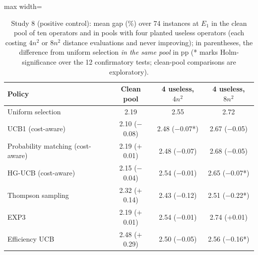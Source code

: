 \begin{table}[t]
\caption{Study 8 (positive control): mean gap (\%) over 74 instances at $E_1$ in the clean pool of ten operators and in pools with four planted useless operators (each costing $4n^2$ or $8n^2$ distance evaluations and never improving); in parentheses, the difference from uniform selection \emph{in the same pool} in pp (* marks Holm-significance over the 12 confirmatory tests; clean-pool comparisons are exploratory).}\label{tab:s8}
\centering
\small
\begin{adjustbox}{max width=\linewidth}
\begin{tabular}{lccc}
\toprule
Policy & Clean pool & 4 useless, $4n^2$ & 4 useless, $8n^2$ \\
\midrule
Uniform selection & 2.19 & 2.55 & 2.72 \\
UCB1 (cost-aware) & 2.10 ($-$0.08) & 2.48 ($-$0.07*) & 2.67 ($-$0.05) \\
Probability matching (cost-aware) & 2.19 ($+$0.01) & 2.48 ($-$0.07) & 2.68 ($-$0.05) \\
HG-UCB (cost-aware) & 2.15 ($-$0.04) & 2.54 ($-$0.01) & 2.65 ($-$0.07*) \\
Thompson sampling & 2.32 ($+$0.14) & 2.43 ($-$0.12) & 2.51 ($-$0.22*) \\
EXP3 & 2.19 ($+$0.01) & 2.54 ($-$0.01) & 2.74 ($+$0.01) \\
Efficiency UCB & 2.48 ($+$0.29) & 2.50 ($-$0.05) & 2.56 ($-$0.16*) \\
\bottomrule
\end{tabular}
\end{adjustbox}
\end{table}
